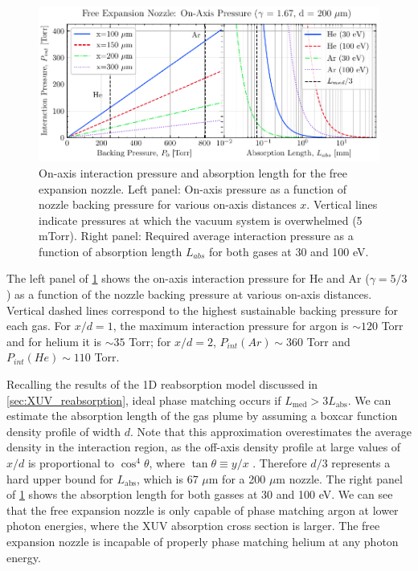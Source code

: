 
\begin{figure}
	\centering
	\includegraphics[width=1.0\textwidth]{figures/chap3/on-axis-pressure.pdf}
	\caption{On-axis interaction pressure and absorption length for the free expansion nozzle. Left panel: On-axis pressure as a function of nozzle backing pressure for various on-axis distances $x$. Vertical lines indicate pressures at which the vacuum system is overwhelmed (5 mTorr). Right panel: Required average interaction pressure as a function of absorption length $L_{abs}$ for both gases at 30 and 100 eV.}
	\label{fig:on-axis-pressure}
\end{figure}

The left panel of \cref{fig:on-axis-pressure} shows the on-axis interaction pressure for He and Ar ($\gamma = 5/3$) as a function of the nozzle backing pressure at various on-axis distances. Vertical dashed lines correspond to the highest sustainable backing pressure for each gas. For $x/d = 1$, the maximum interaction pressure for argon is $\sim 120$ Torr and for helium it is $\sim 35$ Torr; for $x/d = 2$, $P_{int}(Ar) \sim 360$ Torr and $P_{int}(He) \sim 110$ Torr.

Recalling the results of the 1D reabsorption model discussed in \cref{sec:XUV_reabsorption}, ideal phase matching occurs if $L_{\textrm{med}} > 3 L_{\textrm{abs}}$. We can estimate the absorption length of the gas plume by assuming a boxcar function density profile of width $d$. Note that this approximation overestimates the average density in the interaction region, as the off-axis density profile at large values of $x/d$ is proportional to $\cos^4 \theta$, where $\tan \theta \equiv y/x$ \cite{millerFreeJetSources1988}. Therefore $d/3$ represents a hard upper bound for $L_{\textrm{abs}}$, which is 67 $\mu$m for a 200 $\mu$m nozzle. The right panel of \cref{fig:on-axis-pressure} shows the absorption length for both gasses at 30 and 100 eV. We can see that the free expansion nozzle is only capable of phase matching argon at lower photon energies, where the XUV absorption cross section is larger. The free expansion nozzle is incapable of properly phase matching helium at any photon energy.

